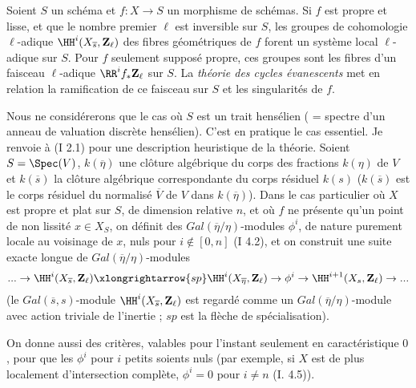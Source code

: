 












Soient $S$ un schéma et $f: X \to S$ un morphisme de schémas. Si $f$ est 
propre et lisse, et que le nombre premier $\ell$ est inversible sur $S$, les groupes de
cohomologie $\ell$-adique $\HH^i(X_{\overline{s}}, \mathbf{Z}_{\ell})$ des fibres géométriques
de $f$ forent un système local $\ell$-adique sur $S$. Pour $f$ seulement supposé propre, ces groupes sont
les fibres d'un faisceau $\ell$-adique $\RR^if_*\mathbf{Z}_{\ell}$ sur $S$. La \emph{théorie des
cycles évanescents} met en relation la ramification de ce faisceau sur $S$ et les
singularités de $f$.

Nous ne considérerons que le cas où $S$ est un trait hensélien ( = spectre d'un anneau
de valuation discrète hensélien). C'est en pratique le cas essentiel. Je renvoie à (I 2.1) pour une
description heuristique de la théorie. Soient $S = \Spec(V)$, $k(\overline{\eta})$ une clôture 
algébrique du corps des fractions $k(\eta)$ de $V$ et $k(\overline{s})$ la clôture algébrique
correspondante du corps résiduel $k(s)$ ($k(\overline{s})$ est le corps résiduel du normalisé 
$\overline{V}$ de $V$ dans $k(\overline{\eta})$). Dans le cas particulier où $X$ est propre et plat
sur $S$, de dimension relative $n$, et où $f$ ne présente qu'un point de non lissité $x \in X_S$,
on définit des $Gal(\overline{\eta}/\eta)$-modules $\phi^i$, de nature purement locale au
voisinage de $x$, nuls pour $i \notin [0, n]$ (I 4.2), et on construit une suite exacte longue de
$Gal(\overline{\eta}/\eta)$-modules
$$ ... \to \HH^i(X_{\overline{s}}, \mathbf{Z}_{\ell}) \xlongrightarrow{sp} \HH^i(X_{\overline{\eta}}, 
\mathbf{Z}_{\ell}) \to \phi^i \to \HH^{i+1}(X_s, \mathbf{Z}_{\ell}) \to ... $$
(le $Gal(\overline{s},s)$-module $\HH^i(X_{\overline{s}}, \mathbf{Z}_{\ell})$ est regardé comme un
$Gal(\overline{\eta}/\eta)$-module avec action triviale de l'inertie ; $sp$ est la flèche de
spécialisation).

On donne aussi des critères, valables pour l'instant seulement en caractéristique $0$, pour que les
$\phi^i$ pour $i$ petits soients nuls (par exemple, si $X$ est de plus localement d'intersection complète,
$\phi^i = 0$ pour $i \neq n$ (I. 4.5)).

